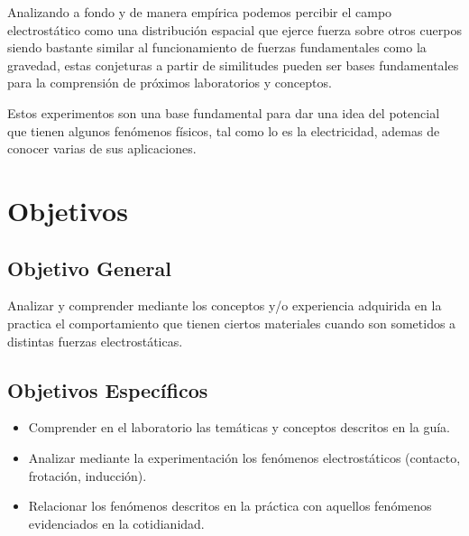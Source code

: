 \documentclass[letterpaper, 12pt]{report}
\begin{document}
\vspace{.5cm}

Analizando a fondo y de manera empírica podemos percibir el campo electrostático
como una distribución espacial que ejerce fuerza sobre otros cuerpos siendo
bastante similar al  funcionamiento de fuerzas fundamentales como la
gravedad, estas conjeturas a partir de similitudes pueden ser bases
fundamentales para la comprensión de próximos laboratorios y conceptos.

\vspace{.5cm}

Estos experimentos son una base fundamental para dar una
idea del potencial que tienen algunos fenómenos físicos, tal como lo es la
electricidad, ademas de conocer varias de sus aplicaciones.

\newpage

\section{Objetivos}

\subsection{Objetivo General}

Analizar  y comprender mediante los conceptos y/o experiencia adquirida en la
practica el comportamiento que tienen ciertos materiales cuando son sometidos
a distintas fuerzas electrostáticas.

\subsection{Objetivos Específicos}

\begin{itemize}
	\item Comprender  en el laboratorio las temáticas y conceptos descritos
	      en la guía.
	\item Analizar mediante la experimentación los fenómenos
	      electrostáticos (contacto, frotación, inducción).
	\item Relacionar los fenómenos descritos en la práctica con aquellos
	      fenómenos evidenciados en la cotidianidad.
\end{itemize}

\newpage

\end{document}
